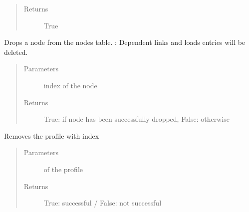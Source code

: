 \documentclass[letterpaper,10pt,english]{sphinxmanual}
\begin{document}
\begin{fulllineitems}
\begin{fulllineitems}
\begin{quote}
\begin{description}
\item[{Returns}] \leavevmode
True

\end{description}\end{quote}

\end{fulllineitems}


\begin{fulllineitems}
\label{\detokenize{api:beamon.database.Database.remove_node}}
Drops a node from the nodes table.
: Dependent links and loads entries will be deleted.
\begin{quote}\begin{description}
\item[{Parameters}] \leavevmode
{} \textendash{} index of the node

\item[{Returns}] \leavevmode
True: if node has been successfully dropped, False: otherwise

\end{description}\end{quote}

\end{fulllineitems}


\begin{fulllineitems}
\label{\detokenize{api:beamon.database.Database.remove_profile}}
Removes the profile with index
\begin{quote}\begin{description}
\item[{Parameters}] \leavevmode
{} \textendash{} of the profile

\item[{Returns}] \leavevmode
True: successful / False: not successful

\end{description}\end{quote}


\end{fulllineitems}
\end{fulllineitems}
\end{document}
